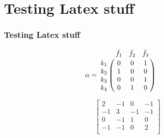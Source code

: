 \documentclass{beamer}
\begin{document}

\section{Testing Latex stuff}
\begin{frame}
\frametitle{\textbf{Testing Latex stuff} }

\[
    \mathbf{\alpha} = 
      \bordermatrix{ & \bar{f_1} & \bar{f_2} & \bar{f_3} \cr
        k_1 & 0 & 0 & 1 \cr
        k_2 & 1 & 0 & 0 \cr
        k_3 & 0 & 0 & 1 \cr
        k_4 & 0 & 1 & 0 } \qquad
\]

\begin{equation*}
    \left\lbrack\begin{array}{cccc}
        2  & -1 & 0  & -1 \\
        -1 & 3  & -1 & -1 \\
        0  & -1 & 1  & 0  \\
        -1 & -1 & 0  & 2  \\
    \end{array}\right\rbrack
\end{equation*}

\end{frame}

\end{document}
